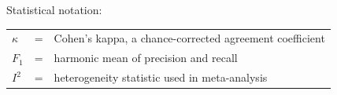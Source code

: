 \vspace{0.6cm}

\noindent Statistical notation:

\vspace{0.2cm}

\begin{longtable}{llp{3.6in}}
	$\kappa$ & \hspace{1cm} = & Cohen's kappa, a chance-corrected agreement coefficient \\
	$F_1$    & \hspace{1cm} = & harmonic mean of precision and recall \\
	$I^2$    & \hspace{1cm} = & heterogeneity statistic used in meta-analysis 
\end{longtable}
